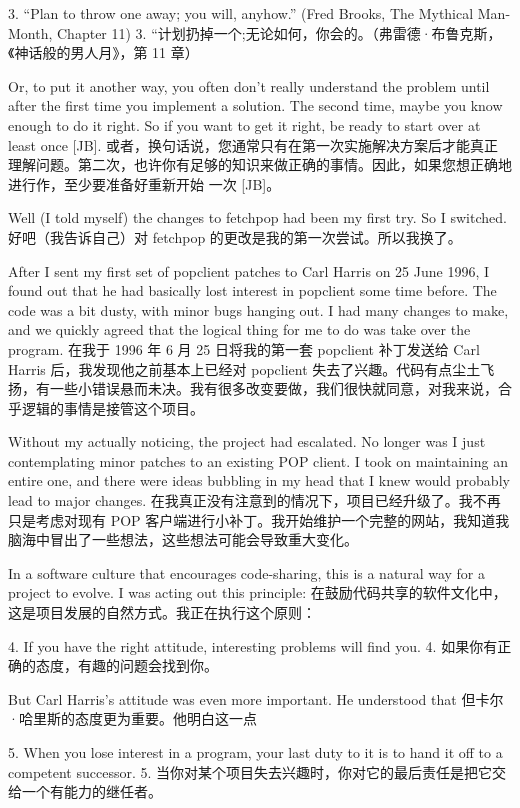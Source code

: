 \documentclass[a4paper,12pt,UTF8,twoside]{ctexbook}
\begin{document}
3. ``Plan to throw one away; you will, anyhow.'' (Fred Brooks, The Mythical Man-Month, Chapter 11)
3. “计划扔掉一个;无论如何，你会的。（弗雷德·布鲁克斯，《神话般的男人月》，第 11 章）

Or, to put it another way, you often don't really understand the problem until after the first time you implement a solution. The second time, maybe you know enough to do it right. So if you want to get it right, be ready to start over at least once [JB].
或者，换句话说，您通常只有在第一次实施解决方案后才能真正理解问题。第二次，也许你有足够的知识来做正确的事情。因此，如果您想正确地进行作，至少要准备好重新开始 一次 [JB]。

Well (I told myself) the changes to fetchpop had been my first try. So I switched.
好吧（我告诉自己）对 fetchpop 的更改是我的第一次尝试。所以我换了。

After I sent my first set of popclient patches to Carl Harris on 25 June 1996, I found out that he had basically lost interest in popclient some time before. The code was a bit dusty, with minor bugs hanging out. I had many changes to make, and we quickly agreed that the logical thing for me to do was take over the program.
在我于 1996 年 6 月 25 日将我的第一套 popclient 补丁发送给 Carl Harris 后，我发现他之前基本上已经对 popclient 失去了兴趣。代码有点尘土飞扬，有一些小错误悬而未决。我有很多改变要做，我们很快就同意，对我来说，合乎逻辑的事情是接管这个项目。

Without my actually noticing, the project had escalated. No longer was I just contemplating minor patches to an existing POP client. I took on maintaining an entire one, and there were ideas bubbling in my head that I knew would probably lead to major changes.
在我真正没有注意到的情况下，项目已经升级了。我不再只是考虑对现有 POP 客户端进行小补丁。我开始维护一个完整的网站，我知道我脑海中冒出了一些想法，这些想法可能会导致重大变化。

In a software culture that encourages code-sharing, this is a natural way for a project to evolve. I was acting out this principle:
在鼓励代码共享的软件文化中，这是项目发展的自然方式。我正在执行这个原则：

4. If you have the right attitude, interesting problems will find you.
4. 如果你有正确的态度，有趣的问题会找到你。

But Carl Harris's attitude was even more important. He understood that
但卡尔·哈里斯的态度更为重要。他明白这一点

5. When you lose interest in a program, your last duty to it is to hand it off to a competent successor.
5. 当你对某个项目失去兴趣时，你对它的最后责任是把它交给一个有能力的继任者。
\end{document}
